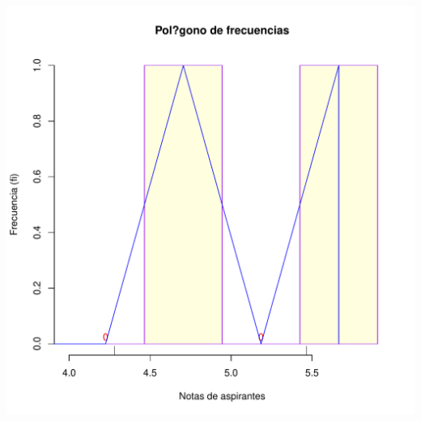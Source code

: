 \documentclass[10pt,a4paper]{article}\usepackage[]{graphicx}\usepackage[]{color}
\makeatletter
\def\maxwidth{ %
  \ifdim\Gin@nat@width>\linewidth
    \linewidth
  \else
    \Gin@nat@width
  \fi
}
\newenvironment{knitrout}{}{} %
\makeatother
\begin{document}
\begin{knitrout}
\includegraphics[width=\maxwidth]{figure/unnamed-chunk-14-1} 

\end{knitrout}
\end{document}
